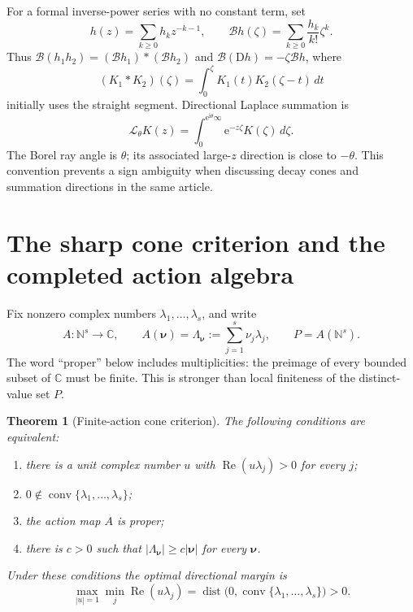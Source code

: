 \documentclass[11pt,a4paper]{article}
\numberwithin{equation}{section}
\newtheorem{theorem}{Theorem}[section]
\theoremstyle{definition}
\theoremstyle{remark}
\newcommand{\C}{\mathbb C}
\newcommand{\N}{\mathbb N}
\newcommand{\D}{\mathrm D}
\newcommand{\ii}{\mathrm i}
\newcommand{\e}{\mathrm e}
\newcommand{\B}{\mathcal B}
\newcommand{\Lap}{\mathcal L}
\newcommand{\Rea}{\operatorname{Re}}
\newcommand{\conv}{\operatorname{conv}}
\newcommand{\dist}{\operatorname{dist}}
\newcommand{\nn}{\boldsymbol\nu}
\begin{document}
For a formal inverse-power series with no constant term, set
\begin{equation}\label{eq:borel-convention}
 h(z)=\sum_{k\ge0}h_kz^{-k-1},\qquad
 \B h(\zeta)=\sum_{k\ge0}\frac{h_k}{k!}\zeta^k.
\end{equation}
Thus $\B(h_1h_2)=(\B h_1)*(\B h_2)$ and
$\B(\D h)=-\zeta\B h$, where
\[
 (K_1*K_2)(\zeta)=\int_0^\zeta K_1(t)K_2(\zeta-t)\,dt
\]
initially uses the straight segment. Directional Laplace summation is
\begin{equation}\label{eq:laplace-convention}
 \Lap_\theta K(z)=\int_0^{\e^{\ii\theta}\infty}\e^{-z\zeta}K(\zeta)\,d\zeta.
\end{equation}
The Borel ray angle is $\theta$; its associated large-$z$ direction is close
to $-\theta$. This convention prevents a sign ambiguity when discussing
decay cones and summation directions in the same article.

\section{The sharp cone criterion and the completed action algebra}\label{sec:cone}

Fix nonzero complex numbers $\lambda_1,\ldots,\lambda_s$, and write
\begin{equation}\label{eq:actions}
 A:\N^s\longrightarrow\C,\qquad
 A(\nn)=\Lambda_{\nn}:=\sum_{j=1}^s\nu_j\lambda_j,
 \qquad P=A(\N^s).
\end{equation}
The word ``proper'' below includes multiplicities: the preimage of every
bounded subset of $\C$ must be finite. This is stronger than local finiteness
of the distinct-value set $P$.

\begin{theorem}[Finite-action cone criterion]\label{thm:cone}
The following conditions are equivalent:
\begin{enumerate}[label=(\roman*)]
\item there is a unit complex number $u$ with $\Rea(u\lambda_j)>0$ for every $j$;
\item $0\notin\conv\{\lambda_1,\ldots,\lambda_s\}$;
\item the action map $A$ is proper;
\item there is $c>0$ such that $|\Lambda_{\nn}|\ge c|\nn|$ for every $\nn$.
\end{enumerate}
Under these conditions the optimal directional margin is
\begin{equation}\label{eq:optimal-margin}
 \max_{|u|=1}\min_j\Rea(u\lambda_j)
 =\dist\bigl(0,\conv\{\lambda_1,\ldots,\lambda_s\}\bigr)>0.
\end{equation}
\end{theorem}
\end{document}

